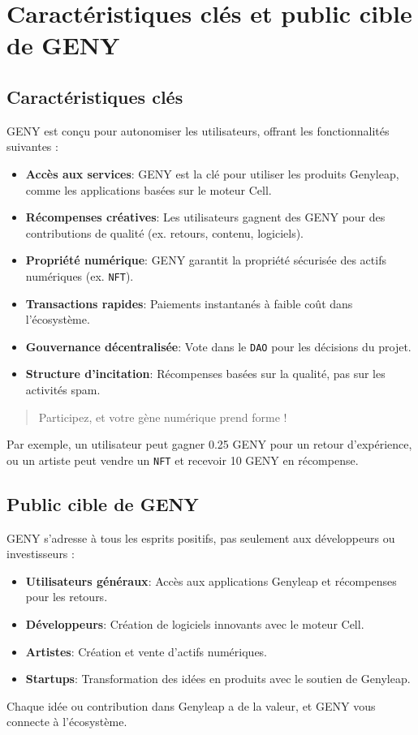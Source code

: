\documentclass[a4paper,12pt,openany]{book}
\begin{document}
\section*{Caractéristiques clés et public cible de GENY}
\subsection*{Caractéristiques clés}
GENY est conçu pour autonomiser les utilisateurs, offrant les fonctionnalités suivantes :
\begin{itemize}
    \item \textbf{Accès aux services}: GENY est la clé pour utiliser les produits Genyleap, comme les applications basées sur le moteur Cell.
    \item \textbf{Récompenses créatives}: Les utilisateurs gagnent des GENY pour des contributions de qualité (ex. retours, contenu, logiciels).
    \item \textbf{Propriété numérique}: GENY garantit la propriété sécurisée des actifs numériques (ex. \texttt{NFT}).
    \item \textbf{Transactions rapides}: Paiements instantanés à faible coût dans l'écosystème.
    \item \textbf{Gouvernance décentralisée}: Vote dans le \texttt{DAO} pour les décisions du projet.
    \item \textbf{Structure d'incitation}: Récompenses basées sur la qualité, pas sur les activités spam.
\end{itemize}
\begin{quote}
Participez, et votre gène numérique prend forme !
\end{quote}
Par exemple, un utilisateur peut gagner 0.25 GENY pour un retour d'expérience, ou un artiste peut vendre un \texttt{NFT} et recevoir 10 GENY en récompense.

\subsection*{Public cible de GENY}
GENY s'adresse à tous les esprits positifs, pas seulement aux développeurs ou investisseurs :
\begin{itemize}
    \item \textbf{Utilisateurs généraux}: Accès aux applications Genyleap et récompenses pour les retours.
    \item \textbf{Développeurs}: Création de logiciels innovants avec le moteur Cell.
    \item \textbf{Artistes}: Création et vente d'actifs numériques.
    \item \textbf{Startups}: Transformation des idées en produits avec le soutien de Genyleap.
\end{itemize}
Chaque idée ou contribution dans Genyleap a de la valeur, et GENY vous connecte à l'écosystème.
\newpage
\end{document}
